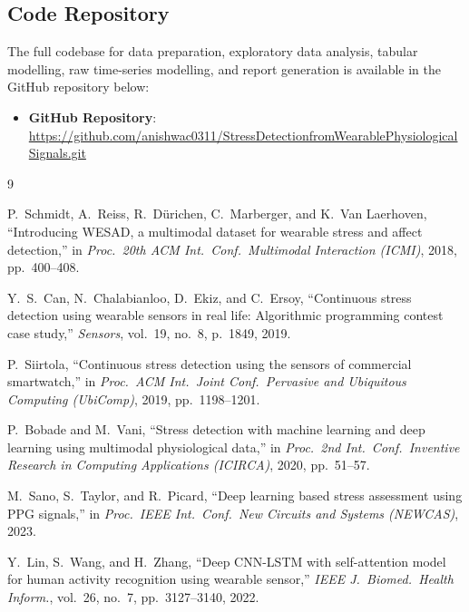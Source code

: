 \documentclass[11pt]{article}
\begin{document}
\subsection{Code Repository}

The full codebase for data preparation, exploratory data analysis, tabular modelling, raw time-series modelling, and report generation is available in the GitHub repository below:

\begin{itemize}
    \item \textbf{GitHub Repository}: \url{https://github.com/anishwac0311/StressDetectionfromWearablePhysiologicalSignals.git}
\end{itemize}


\begin{thebibliography}{9}

P.~Schmidt, A.~Reiss, R.~D\"urichen, C.~Marberger, and K.~Van Laerhoven,
``Introducing WESAD, a multimodal dataset for wearable stress and affect detection,''
in \textit{Proc.\ 20th ACM Int.\ Conf.\ Multimodal Interaction (ICMI)}, 2018, pp.~400--408.

Y.~S.~Can, N.~Chalabianloo, D.~Ekiz, and C.~Ersoy,
``Continuous stress detection using wearable sensors in real life: Algorithmic programming contest case study,''
\textit{Sensors}, vol.~19, no.~8, p.~1849, 2019.

P.~Siirtola,
``Continuous stress detection using the sensors of commercial smartwatch,''
in \textit{Proc.\ ACM Int.\ Joint Conf.\ Pervasive and Ubiquitous Computing (UbiComp)}, 2019, pp.~1198--1201.

P.~Bobade and M.~Vani,
``Stress detection with machine learning and deep learning using multimodal physiological data,''
in \textit{Proc.\ 2nd Int.\ Conf.\ Inventive Research in Computing Applications (ICIRCA)}, 2020, pp.~51--57.

M.~Sano, S.~Taylor, and R.~Picard,
``Deep learning based stress assessment using PPG signals,''
in \textit{Proc.\ IEEE Int.\ Conf.\ New Circuits and Systems (NEWCAS)}, 2023.

Y.~Lin, S.~Wang, and H.~Zhang,
``Deep CNN-LSTM with self-attention model for human activity recognition using wearable sensor,''
\textit{IEEE J.\ Biomed.\ Health Inform.}, vol.~26, no.~7, pp.~3127--3140, 2022.


\end{thebibliography}
\end{document}
